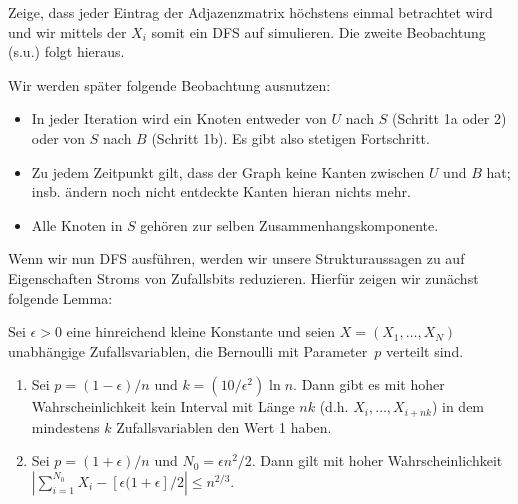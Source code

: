 \begin{exercise}
    Zeige, dass jeder Eintrag der Adjazenzmatrix höchstens einmal betrachtet wird und wir mittels der $X_i$ somit ein DFS auf \Gnp simulieren.
    Die zweite Beobachtung (s.u.) folgt hieraus.
\end{exercise}

Wir werden später folgende Beobachtung ausnutzen:
\begin{itemize}
    \item In jeder Iteration wird ein Knoten entweder von $U$ nach $S$ (Schritt 1a oder 2) oder von $S$ nach $B$ (Schritt 1b).
          Es gibt also stetigen Fortschritt.
    \item Zu jedem Zeitpunkt gilt, dass der Graph keine Kanten zwischen $U$ und $B$ hat; insb. ändern noch nicht entdeckte Kanten hieran nichts mehr.
    \item Alle Knoten in $S$ gehören zur selben Zusammenhangskomponente.
\end{itemize}

Wenn wir nun DFS ausführen, werden wir unsere Strukturaussagen zu \Gnp auf Eigenschaften Stroms von Zufallsbits reduzieren.
Hierfür zeigen wir zunächst folgende Lemma:

\begin{lemma}
    Sei $\epsilon > 0$ eine hinreichend kleine Konstante und seien $X = (X_1, \ldots, X_N)$ unabhängige Zufallsvariablen, die Bernoulli mit Parameter~$p$ verteilt sind.
    \begin{enumerate}
        \item Sei $p = (1 - \epsilon) / n$ und $k = (10 / \epsilon^2) \ln n$.
              Dann gibt es mit hoher Wahrscheinlichkeit kein Interval mit Länge $nk$ (d.h. $X_i, \ldots, X_{i+nk}$) in dem mindestens $k$ Zufallsvariablen den Wert 1 haben.

        \item Sei $p = (1 + \epsilon) /n$ und $N_0 = \epsilon n^2/2$.
              Dann gilt mit hoher Wahrscheinlichkeit $|\sum_{i=1}^{N_0} X_i - [\epsilon(1+\epsilon]/2| \le n^{2/3}$.
              \qedhere
    \end{enumerate}
\end{lemma}

